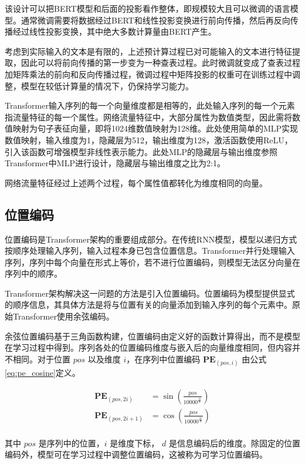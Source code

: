该设计可以把BERT模型和后面的投影看作整体，即规模较大且可以微调的语言模型。通常微调需要将数据经过BERT和线性投影变换进行前向传播，然后再反向传播经过线性投影变换，其中绝大多数计算量由BERT产生。

考虑到实际输入的文本是有限的，上述预计算过程已对可能输入的文本进行特征提取，因此可以将前向传播的第一步变为一种查表过程。此时微调就变成了查表过程加矩阵乘法的前向和反向传播过程，微调过程中矩阵投影的权重可在训练过程中调整，模型在较低计算量的情况下，仍保持学习能力。

Transformer输入序列的每一个向量维度都是相等的，此处输入序列的每一个元素指流量特征的每一个属性。网络流量特征中，大部分属性为数值类型，因此需将数值映射为句子表征向量，即将1024维数值映射为128维。此处使用简单的MLP实现数值映射，输入维度为1，隐藏层为512，输出维度为128，激活函数使用ReLU，引入该函数可增强模型非线性表示能力。此处MLP的隐藏层与输出维度参照Transformer中MLP进行设计，隐藏层与输出维度之比为2:1。

网络流量特征经过上述两个过程，每个属性值都转化为维度相同的向量。
\subsection{位置编码}
位置编码是Transformer架构的重要组成部分。在传统RNN模型，模型以递归方式按顺序处理输入序列，输入过程本身已包含位置信息。Transformer并行处理输入序列，序列中每个向量在形式上等价，若不进行位置编码，则模型无法区分向量在序列中的顺序。

Transformer架构解决这一问题的方法是引入位置编码。位置编码为模型提供显式的顺序信息，其具体方法是将与位置有关的向量添加到输入序列的每个元素中。原始Transformer使用余弦编码。

余弦位置编码基于三角函数构建，位置编码由定义好的函数计算得出，而不是模型在学习过程中得到。序列各处的位置编码维度与嵌入后的向量维度相同，但内容并不相同。对于位置 $pos$ 以及维度 $i$，在序列中位置编码 $\mathbf{PE}_{(pos, i)}$ 由公式\ref{eq:pe_cosine}定义。

\begin{equation}
\begin{aligned}
\mathbf{PE}_{(pos, 2i)} &= \sin\left(\frac{pos}{10000^{\frac{2i}{d}}}\right) \\
\mathbf{PE}_{(pos, 2i+1)} &= \cos\left(\frac{pos}{10000^{\frac{2i}{d}}}\right) \\
\end{aligned}
\label{eq:pe_cosine}
\end{equation}

其中 $pos$ 是序列中的位置，$i$ 是维度下标， $d$ 是信息编码后的维度。除固定的位置编码外，模型可在学习过程中调整位置编码，这被称为可学习位置编码。


